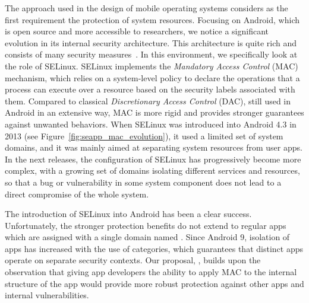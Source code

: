 The approach used in the design of mobile operating systems considers
as the first requirement the protection of system resources.  Focusing
on Android, which is open source and more accessible to researchers,
we notice a significant evolution in its internal security
architecture.  This architecture is quite rich and consists of many
security measures~\cite{seapp_10.1145/2046707.2046779,seapp_tapsm_m}.
In this environment, we specifically look at the role of SELinux.
SELinux implements the {\em Mandatory Access Control} (MAC) mechanism,
which relies on a system-level policy to declare the operations that a
process can execute over a resource based on the security labels
associated with them.  Compared to classical {\em Discretionary Access
  Control} (DAC), still used in Android in an extensive way, MAC is
more rigid and provides stronger guarantees against unwanted
behaviors.  When SELinux was introduced into Android 4.3 in 2013 (see
Figure~\ref{fig:seapp_mac_evolution}), it used a limited set of system
domains, and it was mainly aimed at separating system resources from
user apps.  In the next releases, the configuration of SELinux has
progressively become more complex, with a growing set of domains
isolating different services and resources, so that a bug or
vulnerability in some system component does not lead to a direct
compromise of the whole system.

The introduction of SELinux into Android has been a clear success.
Unfortunately, the stronger protection benefits do not extend to
regular apps which are assigned with a single domain named
\untrustedapp.  Since Android 9, isolation of apps has increased with
the use of categories, which guarantees that distinct apps operate on
separate security contexts.  Our proposal, \seapp, builds upon the
observation that giving app developers the ability to apply MAC to the
internal structure of the app would provide more robust protection
against other apps and internal vulnerabilities.

